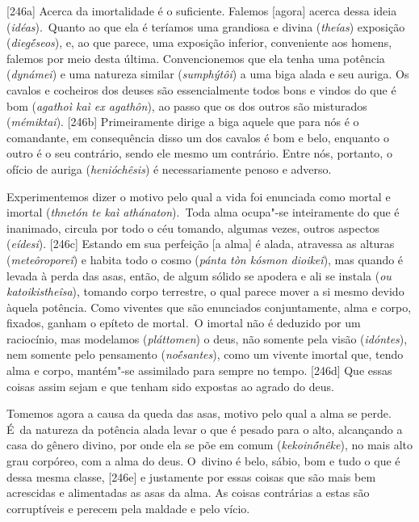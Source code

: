 [246a] Acerca da imortalidade é o suficiente. Falemos [agora]
acerca dessa ideia (\emph{idéas}).~Quanto ao que ela é teríamos uma
grandiosa e divina (\emph{theías}) exposição (\emph{diegḗseos}), e, ao
que parece, uma exposição inferior, conveniente aos homens, falemos por
meio desta última. Convencionemos que ela tenha uma potência
(\emph{dynámei}) e uma natureza similar (\emph{sumphýtôi}) a uma biga
alada e seu auriga. Os cavalos e cocheiros dos deuses são essencialmente
todos bons e vindos do que é bom (\emph{agathoì kaì ex agathôn}), ao
passo que os dos outros são misturados (\emph{mémiktai}). [246b]
Primeiramente dirige a biga aquele que para nós é o comandante, em
consequência disso um dos cavalos é bom e belo, enquanto o outro é o seu
contrário, sendo ele mesmo um contrário. Entre nós, portanto, o ofício
de auriga (\emph{henióchêsis}) é necessariamente penoso e adverso.

Experimentemos dizer o motivo pelo qual a vida foi enunciada como mortal
e imortal (\emph{thnetón te kaì athánaton}).~Toda alma ocupa"-se
inteiramente do que é inanimado, circula por todo o céu tomando, algumas
vezes, outros aspectos (\emph{eídesi}). [246c] Estando em sua
perfeição [a alma] é alada, atravessa as alturas
(\emph{meteôroporeî}) e habita todo o cosmo (\emph{pánta tòn kósmon
dioikeî}), mas quando é levada à perda das asas, então, de algum sólido
se apodera e ali se instala (\emph{ou katoikistheîsa}), tomando corpo
terrestre, o qual parece mover a si mesmo devido àquela potência. Como
viventes que são enunciados conjuntamente, alma e corpo, fixados, ganham
o epíteto de mortal\emph{.~}O imortal não é deduzido por um raciocínio,
mas modelamos (\emph{pláttomen}) o deus, não somente pela visão
(\emph{idóntes}), nem somente pelo pensamento (\emph{noḗsantes}), como
um vivente imortal que, tendo alma e corpo, mantém"-se assimilado para
sempre no tempo. [246d] Que essas coisas assim sejam e que tenham
sido expostas ao agrado do deus.

Tomemos agora a causa da queda das asas, motivo pelo qual a alma se
perde. É~da natureza da potência alada levar o que é pesado para o alto,
alcançando a casa do gênero divino, por onde ela se põe em comum
(\emph{kekoinṓnêke}), no mais alto grau corpóreo, com a alma do deus. O~divino é belo, sábio, bom e tudo o que é dessa mesma classe, [246e]
e justamente por essas coisas que são mais bem acrescidas e alimentadas
as asas da alma. As coisas contrárias a estas são corruptíveis e perecem
pela maldade e pelo vício.


